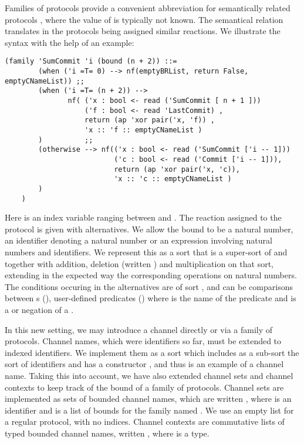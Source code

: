 Families of protocols provide a convenient abbreviation for 
semantically related protocols , where 
the value of  is typically not known. The semantical relation
translates in the protocols being assigned similar reactions.
We illustrate the syntax with the help of an example:
\begin{lstlisting}
(family 'SumCommit 'i (bound (n + 2)) ::= 
        (when ('i =T= 0) --> nf(emptyBRList, return False, emptyCNameList)) ;; 
        (when ('i =T= (n + 2)) --> 
               nf( ('x : bool <- read ('SumCommit [ n + 1 ])) 
                   ('f : bool <- read 'LastCommit) ,
                   return (ap 'xor pair('x, 'f)) ,
                   'x :: 'f :: emptyCNameList )
        )          ;;
        (otherwise --> nf(('x : bool <- read ('SumCommit ['i -- 1])) 
                          ('c : bool <- read ('Commit ['i -- 1])),
                          return (ap 'xor pair('x, 'c)),
                          'x :: 'c :: emptyCNameList )
        )                  
    )
\end{lstlisting}    
Here  is an index 
variable ranging between  and .
The reaction assigned to the protocol  is given
with alternatives. 
We allow the bound to be a natural number, an identifier denoting a 
natural number or an expression involving natural numbers and
identifiers. 
We represent this as a sort  that is a super-sort of
 and  together with 
addition, deletion (written \code{--}) and multiplication on that sort,
extending in the expected way the corresponding operations on natural
numbers. The conditions occuring in the alternatives are of sort
, and can be comparisons between s
(),
user-defined predicates () where  is 
the name of the predicate and  is a  or negation
of a .

In this new setting, we may introduce a channel directly or via a family
of protocols. 
Channel names, which were identifiers so far, must be extended to
indexed identifiers. We implement them as a sort
 which includes as a sub-sort the sort of identifiers
and  has a constructor ,
and thus  is an example of a channel name. 
Taking this into account, we
have also extended channel sets and channel contexts to keep track of the 
bound of a family of protocols. Channel sets are implemented as
sets of bounded channel names, which are written , where  is an identifier and 
 is a list of bounds for the family named
. We use an empty list for a regular protocol, with no indices. Channel contexts are commutative lists of 
typed bounded channel names, written 
, where  is a type.


